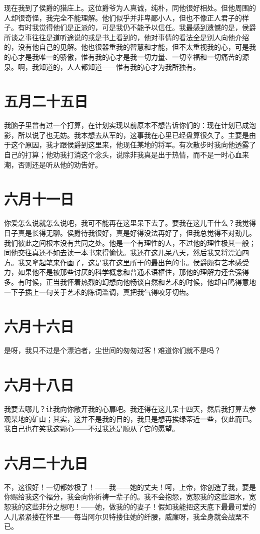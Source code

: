 \documentclass[12pt,oneside]{book}
\begin{document}
现在我到了侯爵的猎庄上。这位爵爷为人真诚，纯朴，同他很好相处。但他周围的人却很奇怪，我完全不能理解。他们似乎并非卑鄙小人，但也不像正人君子的样子。有时我觉得他们是正派的，可是我仍不能予以信任。我最感到遗憾的是，侯爵所谈之事往往是道听途说的或是书上看到的，他对事情的看法全是别人向他介绍的，没有他自己的见解。他也很器重我的智慧和才能，但不太重视我的心，可是我的心才是我唯一的骄傲，惟有我的心才是我一切力量、一切幸福和一切痛苦的源泉。啊，我知道的，人人都知道——惟有我的心才为我所独有。
　　

\chapter{五月二十五日}
我脑子里曾有过一个打算，在计划实现以前原本不想告诉你们的：现在计划已成泡影，所以说了也无妨。我本想去从军的，这事我在心里已经盘算很久了。主要是由于这个原因，我才跟侯爵到这里来，他现任某地的将军。有次散步时我向他透露了自己的打算；他劝我打消这个念头，说除非我真是出于热情，而不是一时心血来潮，否则还是听从他的劝告好。
　　

\chapter{六月十一日}
你爱怎么说就怎么说吧，我可不能再在这里呆下去了。要我在这儿干什么？我觉得日子真是长得无聊。侯爵待我很好，真是好得没法再好了，但我总觉得不对劲儿。我们彼此之间根本没有共同之处。他是一个有理性的人，不过他的理性极其一般；同他交往真还不如去读一本书来得愉快。我还在这儿呆八天，然后我又将漂泊四方。我又拿起笔来作画了，这是我在这里所干的最出色的事。侯爵颇有艺术感受力，如果他不是被那些讨厌的科学概念和普通术语框住，那他的理解力还会强得多。有时候，正当我怀着热烈的幻想向他畅谈自然和艺术的时候，他却自鸣得意地一下子插上一句关于艺术的陈词滥调，真把我气得咬牙切齿。
　　

\chapter{六月十六日}
是呀，我只不过是个漂泊者，尘世间的匆匆过客！难道你们就不是吗？
　　

\chapter{六月十八日}
我要去哪儿？让我向你敞开我的心扉吧。我还得在这儿呆十四天，然后我打算去参观某地的矿山；其实，这并不是我的目的，我只是想再挨绿蒂近一些，仅此而已。我自己也在笑我这颗心——不过我还是顺从了它的愿望。
　　

\chapter{六月二十九日}
不，这很好！一切都妙极了！——我——她的丈夫！呵，上帝，你创造了我，要是你赐给我这个福分，我会向你祈祷一辈子的。我不会抱怨，宽恕我的这些泪水，宽恕我的这些非分之想吧！——她，做我的的妻子！假如我能把这天底下最最可爱的人儿紧紧搂在怀里——每当阿尔贝特搂住她的纤腰，威廉呀，我全身就会战栗不已。
\end{document}
